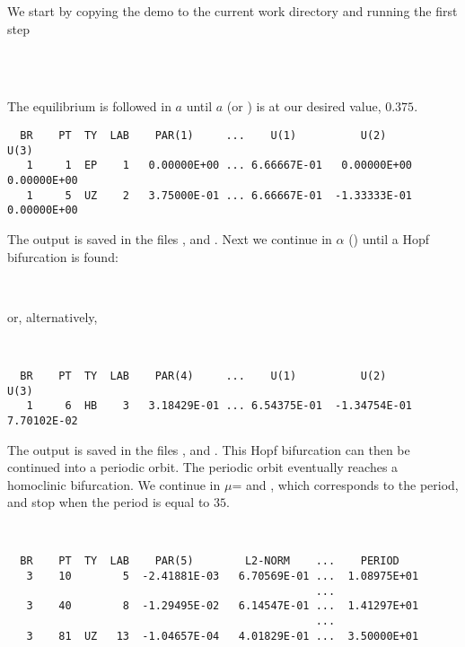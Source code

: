\documentclass[12pt]{report}
\begin{document}
We start by copying the demo to the current work directory 
and running the first step
\begin{center}
\\
 \\
\end{center}
The equilibrium is followed in $a$ until $a$ (or ) is at our
desired value, $0.375$.
\begin{verbatim}
  BR    PT  TY  LAB    PAR(1)     ...    U(1)          U(2)          U(3)     
   1     1  EP    1   0.00000E+00 ... 6.66667E-01   0.00000E+00   0.00000E+00
   1     5  UZ    2   3.75000E-01 ... 6.66667E-01  -1.33333E-01   0.00000E+00
\end{verbatim}
The output is saved in the files ,  and
.
Next we continue in $\alpha$ () until a Hopf bifurcation is
found:
\begin{center}
\\
\end{center}
or, alternatively,
\begin{center}
\\
\end{center}
\begin{verbatim}
  BR    PT  TY  LAB    PAR(4)     ...    U(1)          U(2)          U(3)     
   1     6  HB    3   3.18429E-01 ... 6.54375E-01  -1.34754E-01   7.70102E-02
\end{verbatim}
The output is saved in the files ,  and
.
This Hopf bifurcation can then be continued into a periodic orbit. The
periodic orbit eventually reaches a homoclinic bifurcation. We
continue in $\mu$= and , 
which corresponds to the period, and stop when the period is equal to $35$.
\begin{center}
 \\
\end{center}
\begin{verbatim}
  BR    PT  TY  LAB    PAR(5)        L2-NORM    ...    PERIOD    
   3    10        5  -2.41881E-03   6.70569E-01 ...  1.08975E+01
                                                ...
   3    40        8  -1.29495E-02   6.14547E-01 ...  1.41297E+01
                                                ...
   3    81  UZ   13  -1.04657E-04   4.01829E-01 ...  3.50000E+01
\end{verbatim}
\end{document}
